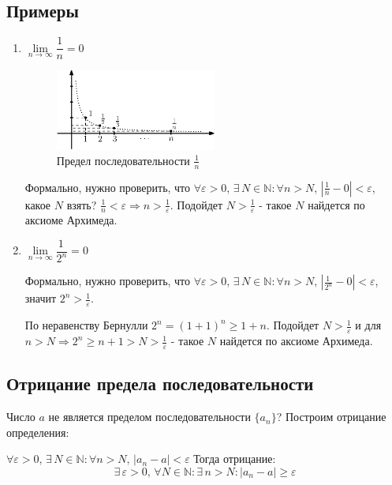 \documentclass[12pt]{article}
\theoremstyle{definition}
\newenvironment{cusdefn}[1]
{\renewcommand\thedefn{#1}\defn}
{\enddefn}
\begin{document}
\subsection*{Примеры}
\begin{enumerate}

\item $\lim\limits_{n \rightarrow \infty}{\dfrac{1}{n}} = 0$

 	\begin{figure}[H]
		\centering
		\includegraphics[width=0.5\textwidth]{7_5.eps}
		\caption{Предел последовательности $\frac{1}{n}$}
		\label{fig:7_5}
	\end{figure}

Формально, нужно проверить, что $\forall \varepsilon > 0,\, \exists \, N \in \mathbb{N} \colon \forall n > N, \, |\frac{1}{n} - 0| < \varepsilon$, какое $N$ взять? $\frac{1}{n} < \varepsilon \Rightarrow n > \frac{1}{\varepsilon}$. Подойдет $N > \frac{1}{\varepsilon}$ - такое $N$ найдется по аксиоме Архимеда.

\item $\lim\limits_{n \rightarrow \infty}{\dfrac{1\,}{2^n}} = 0$

Формально, нужно проверить, что $\forall \varepsilon > 0,\, \exists \,N \in \mathbb{N} \colon \forall n > N, \, |\frac{1\,}{2^n} - 0| < \varepsilon$, значит $2^n > \frac{1}{\varepsilon}$.

 По неравенству Бернулли $2^n = (1+1)^n \geq 1+n$. Подойдет $N >  \frac{1}{\varepsilon}$ и для $n > N \Rightarrow 2^n \geq n+1 > N > \frac{1}{\varepsilon}$ - такое $N$ найдется по аксиоме Архимеда.
\end{enumerate}

\subsection*{Отрицание предела последовательности}
Число $a$ не является пределом последовательности $\{a_n\}$? Построим отрицание определения:

\begin{cusdefn}{10}
 $\forall \varepsilon > 0,\, \exists \, N\in \mathbb{N} \colon \forall n > N, \, |a_n - a| < \varepsilon$
\end{cusdefn}
Тогда отрицание: $$\exists\, \varepsilon > 0,\, \forall N \in \mathbb{N} \colon \exists\, n > N\colon |a_n - a| \geq \varepsilon$$
\end{document}
